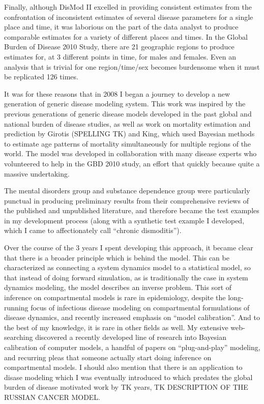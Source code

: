 Finally, although DisMod II excelled in providing consistent estimates
from the confrontation of inconsistent estimates of several disease
parameters for a single place and time, it was laborious on the part
of the data analyst to produce comparable estimates for a variety of
different places and times. In the Global Burden of Disease 2010
Study, there are 21 geographic regions to produce estimates for, at 3
different points in time, for males and females. Even an analysis that
is trivial for one region/time/sex becomes burdensome when it must be
replicated 126 times.

It was for these reasons that in 2008 I began a journey to develop a
new generation of generic disease modeling system. This work was
inspired by the previous generations of generic disease models
developed in the past global and national burden of disease studies,
as well as work on mortality estimation and prediction by Girotis
(SPELLING TK) and King, which used Bayesian methods to estimate age
patterns of mortality simultaneously for multiple regions of the
world. The model was developed in collaboration with many disease
experts who volunteered to help in the GBD 2010 study, an effort that
quickly because quite a massive undertaking.

The mental disorders group and substance dependence group were
particularly punctual in producing preliminary results from their
comprehensive reviews of the published and unpublished literature, and
therefore became the test examples in my development process (along
with a synthetic test example I developed, which I came to
affectionately call ``chronic dismoditis'').

Over the course of the 3 years I spent developing this approach, it
became clear that there is a broader principle which is behind the
model.  This can be characterized as connecting a system dynamics
model to a statistical model, so that instead of doing forward
simulation, as is traditionally the case in system dynamics modeling,
the model describes an inverse problem. This sort of inference on
compartmental models is rare in epidemiology, despite the long-running
focus of infectious disease modeling on compartmental formulations of
disease dynamics, and recently increased emphasis on ``model
calibration''. And to the best of my knowledge, it is rare in other
fields as well. My extensive web-searching discovered a recently
developed line of research into Bayesian calibration of computer
models, a handful of papers on ``plug-and-play'' modeling, and recurring
pleas that someone actually start doing inference on compartmental
models. I should also mention that there is an application to disase
modeling which I was eventually introduced to which predates the
global burden of disease motivated work by TK years, TK DESCRIPTION OF
THE RUSSIAN CANCER MODEL.

